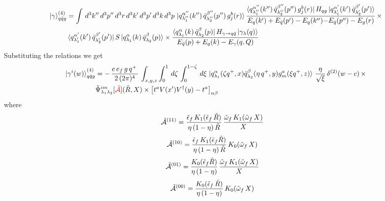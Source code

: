 \documentclass[9pt]{article}
\newif\ifmarked \markedtrue
\newcommand{\chg}[1]{\ifmarked{\color{red}#1}\else{#1}\fi}
\numberwithin{equation}{section}
\begin{document}
\begin{enumerate}
\begin{align}
    \ket{\gamma}^{(4)}_{q\Bar{q}g} & =  \int\, d^{3}k''\, d^{3}p''\, d^{3}r\, d^{3}k'\, d^{3}p'\, d^{3}k\, d^{3}p\,\ket{q^{\alpha''}_{\lambda''_{1}}(k'')\,\Bar{q}^{\beta''}_{\lambda''_{2}}(p'')\,g^{b}_{j}(r)}\frac{\bra{q^{\alpha''}_{\lambda''_{1}}(k'')\,\Bar{q}^{\beta''}_{\lambda''_{2}}(p'')\,g^{b}_{j}(r)}H_{qg}\ket{q^{\alpha'}_{\lambda'_{1}}(k')\,\Bar{q}^{\beta'}_{\lambda'_{2}}(p')}}{E_{q}(k')+E_{\Bar{q}}(p')-E_{q}(k'')\chg{-}E_{\Bar{q}}(p'')-E_{g}(r)}\,\times \notag \\ & \bra{q^{\alpha'}_{\lambda'_{1}}(k')\,\Bar{q}^{\beta'}_{\lambda'_{2}}(p')}S\ket{q^{\alpha}_{\lambda_{1}}(k)\,\Bar{q}^{\beta}_{\lambda_{2}}(p)}\times  \frac{\bra{q^{\alpha}_{\lambda_{1}}(k)\,\Bar{q}^{\beta}_{\lambda_{2}}(p)}H_{\gamma\rightarrow q\Bar{q}}\ket{\gamma_{\lambda}(q)}}{E_{\Bar{q}}(p)+E_{q}(k)-E_{\gamma}(q,Q)}
\label{chg:denb}\end{align}
Substituting the relations we get
\begin{align}
    \ket{\gamma^{i}(w)}^{(4)}_{q\Bar{q}g} & = -\,\frac{e\,e_{f}\,g\,q^{+}\,}{2\,(2\pi)^{4}}\, \int_{x,y,z} \int_{0}^{1}\, d\zeta\, \int_{0}^{1-\zeta}\, d\xi\,\ket{q^{\alpha}_{\lambda_{1}}(\zeta q^{+},x)\Bar{q}^{\beta}_{\lambda_{2}}(\eta\,q^{+},y)g^{a}_{m}(\xi q^{+},z)}\, \frac{\eta}{\sqrt{\xi}}\, \delta^{(2)}(w-c)\,\times \notag \\ & \Tilde{\Psi}^{im}_{\lambda_{1}\lambda_{2}}[\chg{\mathcal{\Tilde{A}}}](\Tilde{R},X)\times \left[t^{a}V(x')V^{\dagger}(y)-t^a\right]_{\alpha\beta}
\label{chg:PsiAq}\end{align}
where 
\begin{align}
    \mathcal{\Tilde{A}}^{(11)} & = \frac{\Tilde{\epsilon}_{f}\,K_{1}(\Tilde{\epsilon}_{f}\,\Tilde{R})}{\eta\,(1-\eta)\,\Tilde{R}}\, \frac{\Tilde{\omega}_{f}\,K_{1}(\Tilde{\omega}_{f}\,X)}{X}
\end{align}
\begin{align}
    \mathcal{\Tilde{A}}^{(10)} & = \frac{\Tilde{\epsilon}_{f}\,K_{1}(\Tilde{\epsilon}_{f}\Tilde{R})}{\eta\,(1-\eta)\,\Tilde{R}}\, K_{0}(\Tilde{\omega}_{f}\,X)
\end{align}
\begin{align}
    \mathcal{\Tilde{A}}^{(01)} & =   \frac{K_{0}(\Tilde{\epsilon}_{f}\Tilde{R})}{\eta\,(1-\eta)}\,\frac{\Tilde{\omega}_{f}\,K_{1}(\Tilde{\omega}_{f}\,X)}{X}
\end{align}
\begin{align}
    \mathcal{\Tilde{A}}^{(00)} & = \frac{K_{0}(\Tilde{\epsilon}_{f}\,\Tilde{R})}{\eta\,(1-\eta)}\, K_{0}(\Tilde{\omega}_{f}\,X)
\end{align}

\end{enumerate}
\end{document}
